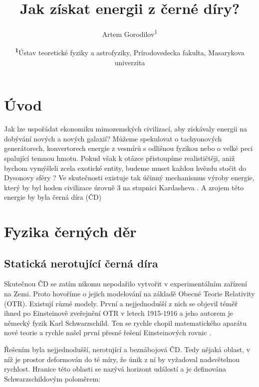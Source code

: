\documentclass[
	a4paper, %
	10pt, %
	unnumberedsections, %
	twoside, %
]{LTJournalArticle}
\title{Jak získat energii z černé díry?} %
\author{%
	Artem Gorodilov\textsuperscript{1}
}
\date{\footnotesize\textsuperscript{\textbf{1}}Ústav teoretické fyziky a astrofyziky, Prírodovedecka fakulta, Masarykova univerzita}
\begin{document}
\maketitle %


\section{Úvod}

Jak lze uspořádat ekonomiku mimozemských civilizací, aby získávaly energii na dobývání nových a nových galaxií? Můžeme spekulovat o tachyonových generátorech, konvertorech energie z vesmírů s odlišnou fyzikou nebo o velké peci spalující temnou hmotu. Pokud však k otázce přistoupíme realističtěji, aniž bychom vymýšleli zcela exotické entity, budeme muset každou hvězdu stočit do Dysonovy sféry \autocite{dyson1960}? Ve skutečnosti existuje tak účinný mechanismus výroby energie, který by byl hoden civilizace úrovně 3 na stupnici Kardasheva \autocite{kardashev1964}. A zrojem této energie by byla černá díra (ČD)


\section{Fyzika černých děr}

\subsection{Statická nerotující černá díra}

Skutečnou ČD se zatím nikomu nepodařilo vytvořit v experimentálním zařízení na Zemi. Proto hovoříme o jejich modelování na základě Obecné Teorie Relativity (OTR). Existují různé modely. První a nejjednodušší z nich se objevil téměř ihned po Einsteinově zveřejnění OTR v letech 1915-1916 a jeho autorem je německý fyzik Karl Schwarzschild. Ten se rychle chopil matematického aparátu nové teorie a rychle našel první přesné řešení Einsteinových rovnic \autocite{schwarzschild1999}. 

Řešením byla nejjednodušší, nerotující a beznábojová ČD. Tedy nějaká oblast, v níž je prostor deformován do té míry, že únik z ní by vyžadoval nadsvětelnou rychlost. Hranice této oblasti se nazývá horizont událostí a je definována Schwarzschildovým poloměrem:
\end{document}
